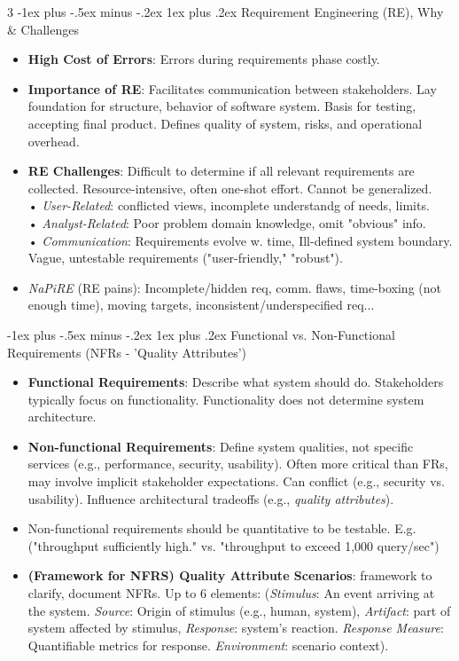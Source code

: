 \documentclass[a4paper, 10pt, landscape]{article}
\makeatletter
\renewcommand{\subsubsection}{\@startsection{subsubsection}{3}{0mm}%
                                {-1ex plus -.5ex minus -.2ex}%
                                {1ex plus .2ex}%
                                {\normalfont\small\bfseries}}
\makeatother
\begin{document}
\begin{multicols*}{3}
\subsubsection{Requirement Engineering (RE), Why \& Challenges}
\begin{itemize}
	\item \textbf{High Cost of Errors}: Errors during requirements phase costly.
    \item \textbf{Importance of RE}: Facilitates communication between stakeholders. Lay foundation for structure, behavior of software system. Basis for testing, accepting final product. Defines quality of system, risks, and operational overhead. 
    \item \textbf{RE Challenges}: Difficult to determine if all relevant requirements are collected. Resource-intensive, often one-shot effort. Cannot be generalized.\\
    • \textit{User-Related}: conflicted views, incomplete understandg of needs, limits.\\
    • \textit{Analyst-Related}: Poor problem domain knowledge, omit "obvious" info. \\
    • \textit{Communication}: Requirements evolve w. time, Ill-defined system boundary. Vague, untestable requirements ("user-friendly," "robust").
    \item \textit{NaPiRE} (RE pains): Incomplete/hidden req, comm. flaws, time-boxing (not enough time), moving targets, inconsistent/underspecified req...
\end{itemize}

\subsubsection{Functional vs. Non-Functional Requirements \scriptsize{ (NFRs - 'Quality Attributes')}}
\begin{itemize}
	\item \textbf{Functional Requirements}: Describe what system should do. Stakeholders typically focus on functionality. Functionality does not determine system architecture.
    \item \textbf{Non-functional Requirements}: Define system qualities, not specific services (e.g., performance, security, usability). Often more critical than FRs, may involve implicit stakeholder expectations. Can conflict (e.g., security vs. usability). Influence architectural tradeoffs (e.g., \textit{quality attributes}).
    \item Non-functional requirements should be quantitative to be testable. E.g. ("throughput sufficiently high." vs. "throughput to exceed 1,000 query/sec")
    \item \textbf{(Framework for NFRS) Quality Attribute Scenarios}: framework to clarify, document NFRs. Up to 6 elements: (\textit{Stimulus}: An event arriving at the system. \textit{Source}: Origin of stimulus (e.g., human, system), \textit{Artifact}: part of system affected by stimulus, \textit{Response}: system's reaction. \textit{Response Measure}: Quantifiable metrics for response. \textit{Environment}: scenario context).
\end{itemize}


\end{multicols*}
\end{document}
